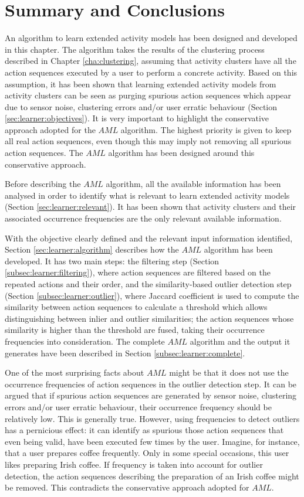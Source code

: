 \section{Summary and Conclusions}
\label{sec:learner:summary}

An algorithm to learn extended activity models has been designed and developed in this chapter. The algorithm takes the results of the clustering process described in Chapter \ref{cha:clustering}, assuming that activity clusters have all the action sequences executed by a user to perform a concrete activity. Based on this assumption, it has been shown that learning extended activity models from activity clusters can be seen as purging spurious action sequences which appear due to sensor noise, clustering errors and/or user erratic behaviour (Section \ref{sec:learner:objectives}). It is very important to highlight the conservative approach adopted for the $AML$ algorithm. The highest priority is given to keep all real action sequences, even though this may imply not removing all spurious action sequences. The $AML$ algorithm has been designed around this conservative approach.

Before describing the $AML$ algorithm, all the available information has been analysed in order to identify what is relevant to learn extended activity models (Section \ref{sec:learner:relevant}). It has been shown that activity clusters and their associated occurrence frequencies are the only relevant available information.

With the objective clearly defined and the relevant input information identified, Section \ref{sec:learner:algorithm} describes how the $AML$ algorithm has been developed. It has two main steps: the filtering step (Section \ref{subsec:learner:filtering}), where action sequences are filtered based on the repeated actions and their order, and the similarity-based outlier detection step (Section \ref{subsec:learner:outlier}), where Jaccard coefficient is used to compute the similarity between action sequences to calculate a threshold which allows distinguishing between inlier and outlier similarities; the action sequences whose similarity is higher than the threshold are fused, taking their occurrence frequencies into consideration. The complete $AML$ algorithm and the output it generates have been described in Section \ref{subsec:learner:complete}. 

One of the most surprising facts about $AML$ might be that it does not use the occurrence frequencies of action sequences in the outlier detection step. It can be argued that if spurious action sequences are generated by sensor noise, clustering errors and/or user erratic behaviour, their occurrence frequency should be relatively low. This is generally true. However, using frequencies to detect outliers has a pernicious effect: it can identify as spurious those action sequences that even being valid, have been executed few times by the user. Imagine, for instance, that a user prepares coffee frequently. Only in some special occasions, this user likes preparing Irish coffee. If frequency is taken into account for outlier detection, the action sequences describing the preparation of an Irish coffee might be removed. This contradicts the conservative approach adopted for $AML$.

